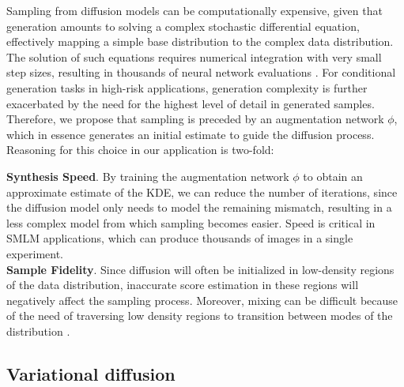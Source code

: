 Sampling from diffusion models can be computationally expensive, given that generation amounts to solving a complex stochastic differential equation, effectively mapping a simple base distribution to the complex data distribution. The solution of such equations requires numerical integration with very small step sizes, resulting in thousands of neural network evaluations \parencite{Saharia2021,Vahdat2021}. For conditional generation tasks in high-risk applications, generation complexity is further exacerbated by the need for the highest level of detail in generated samples. Therefore, we propose that sampling is preceded by an augmentation network $\phi$, which in essence generates an initial estimate to guide the diffusion process. Reasoning for this choice in our application is two-fold:

\textbf{Synthesis Speed}. By training the augmentation network $\phi$ to obtain an approximate estimate of the KDE, we can reduce the number of iterations, since the diffusion model only needs to model the remaining mismatch, resulting in a less complex model from which sampling becomes easier. Speed is critical in SMLM applications, which can produce thousands of images in a single experiment.\\

\textbf{Sample Fidelity}. Since diffusion will often be initialized in low-density regions of the data distribution, inaccurate score estimation in these regions will negatively affect the sampling process. Moreover, mixing can be difficult because of the need of traversing low density regions to transition between modes of the distribution \parencite{Song2019}.

\subsection{Variational diffusion}

